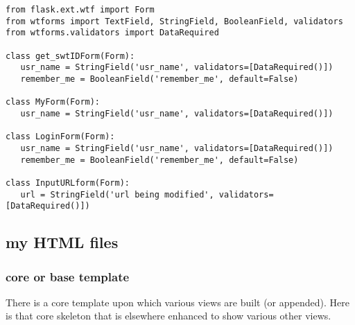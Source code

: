 \documentclass[11pt]{article}
\begin{document}
\begin{verbatim}
from flask.ext.wtf import Form
from wtforms import TextField, StringField, BooleanField, validators
from wtforms.validators import DataRequired

class get_swtIDForm(Form):
   usr_name = StringField('usr_name', validators=[DataRequired()])
   remember_me = BooleanField('remember_me', default=False)

class MyForm(Form):
   usr_name = StringField('usr_name', validators=[DataRequired()])

class LoginForm(Form):
   usr_name = StringField('usr_name', validators=[DataRequired()])
   remember_me = BooleanField('remember_me', default=False)

class InputURLform(Form):
   url = StringField('url being modified', validators=[DataRequired()])
\end{verbatim}
\subsection{my HTML files}
\label{sec-7-4}
\subsubsection{core or base template}
\label{sec-7-4-1}

There is a core template upon which various views are built (or
appended). Here is that core skeleton that is elsewhere enhanced to
show various other views.
\end{document}
